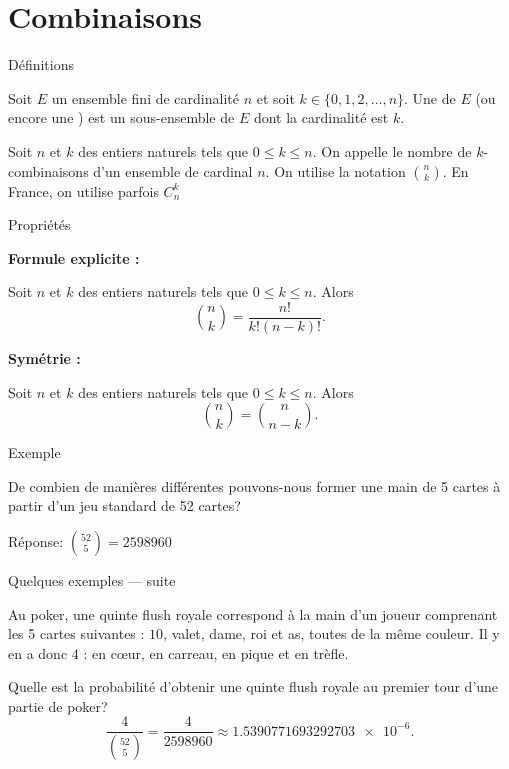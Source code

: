 \documentclass[nuit,charter,pied]{BeamerJS}
\begin{document}
\section{Combinaisons}
\begin{frame}{Définitions}
\pause
\begin{defn}
Soit $E$ un ensemble fini de cardinalité $n$ et soit $k\in\{0,1,2,\ldots,n\}$. Une  de $E$ (ou encore une ) est un sous-ensemble de $E$ dont la cardinalité est $k$.
\end{defn}
\pause
\begin{defn}
	Soit $n$ et $k$ des entiers naturels tels que $0\leq k\leq n$. On appelle  le nombre de $k$-combinaisons d'un ensemble de cardinal $n$. On utilise la notation \(\binom{n}{k}\). En France, on utilise parfois $C_n^k$
\end{defn}
\end{frame}
\begin{frame}{Propriétés}
\pause
\begin{props}
\textbf{Formule explicite :}

Soit $n$ et $k$ des entiers naturels tels que $0\leq k\leq n$. Alors
\[\binom{n}{k}=\frac{n!}{k!(n-k)!}.\]

\pause
\medskip
\textbf{Symétrie :}

Soit $n$ et $k$ des entiers naturels tels que $0\leq k\leq n$. Alors
\[\binom{n}{k}=\binom{n}{n-k}.\]
\end{props}
\end{frame}
\begin{frame}{Exemple}
\pause
\begin{ex}
De combien de manières différentes pouvons-nous former une main de 5 cartes à partir d'un jeu standard de 52 cartes?
\end{ex}
\vfill
\pause
{\color{black!60}Réponse: \(\binom{52}{5}=\num{2598960}\)}
\end{frame}
\begin{frame}{Quelques exemples --- suite}
\pause
\begin{exs}
Au poker, une quinte flush royale correspond à la main d'un joueur comprenant les 5 cartes suivantes : $10$, valet, dame, roi et as, toutes de la même couleur. Il y en a donc $4$ : en cœur, en carreau, en pique et en trèfle.
\end{exs}
\pause
Quelle est la probabilité d'obtenir une quinte flush royale au premier tour d'une partie de poker?
\pause
\[\frac{4}{\binom{52}{5}}=\frac{4}{\num{2598960}}\approx \num{1.5390771693292703e-6}.\]
\end{frame}
\end{document}
